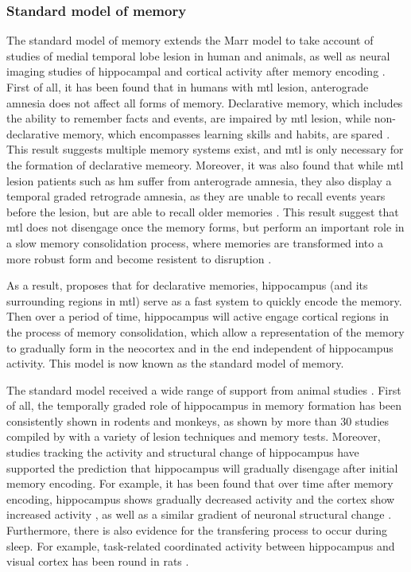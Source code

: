 \subsubsection{Standard model of memory \label{hpc-squire}}
The standard model of memory extends the Marr model to take account of studies of medial temporal lobe lesion in human and animals, as well as neural imaging studies of hippocampal and cortical activity after memory encoding \citep{squire92, squire09}. First of all, it has been found that in humans with \gls{mtl} lesion, anterograde amnesia does not affect all forms of memory. Declarative memory, which includes the ability to remember facts and events, are impaired by \gls{mtl} lesion, while non-declarative memory, which encompasses learning skills and habits, are spared \citep{cohen80, squire04}. This result suggests multiple memory systems exist, and \gls{mtl} is only necessary for the formation of declarative memeory. Moreover, it was also found that while \gls{mtl} lesion patients such as \gls{hm} suffer from anterograde amnesia, they also display a temporal graded retrograde amnesia, as they are unable to recall events years before the lesion, but are able to recall older memories \citep{marslen-wilson75}. This result suggest that \gls{mtl} does not disengage once the memory forms, but perform an important role in a slow memory consolidation process, where memories are transformed into a more robust form and become resistent to disruption \citep{squire92}. 

As a result, \citet{squire92} proposes that for declarative memories, hippocampus (and its surrounding regions in \gls{mtl}) serve as a fast system to quickly encode the memory. Then over a period of time, hippocampus will active engage cortical regions in the process of memory consolidation, which allow a representation of the memory to gradually form in the neocortex and in the end independent of hippocampus activity. This model is now known as the standard model of memory. 

The standard model received a wide range of support from animal studies \citep{squire09}. First of all, the temporally graded role of hippocampus in memory formation has been consistently shown in rodents and monkeys, as shown by more than 30 studies compiled by \citet{frankland05} with a variety of lesion techniques and memory tests. Moreover, studies tracking the activity and structural change of hippocampus have supported the prediction that hippocampus will gradually disengage after initial memory encoding. For example, it has been found that over time after memory encoding, hippocampus shows gradually decreased activity and the cortex show increased activity \citep[e.g.,][]{bontempi99, frankland04a, takehara-nishiuchi06}, as well as a similar gradient of neuronal structural change \citep[e.g.][]{routtenberg00, maviel04, restivo09}. Furthermore, there is also evidence for the transfering process to occur during sleep. For example, task-related coordinated activity between hippocampus and visual cortex has been round in rats \citep{ji07}. 

